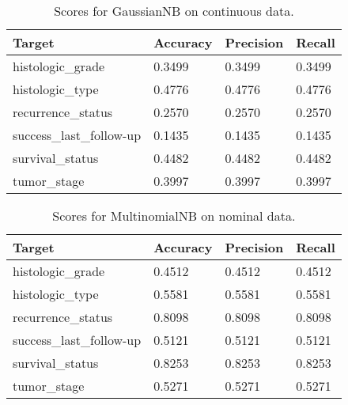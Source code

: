 \documentclass{article}
\begin{document}
\begin{table}[H]
  \begin{center}
  \begin{tabular}{ *{4}{l} }
      \multicolumn{1}{p{1.5cm}}{\raggedright Target} &  
      \multicolumn{1}{p{1.5cm}}{\raggedright Accuracy} &  
      \multicolumn{1}{p{1.5cm}}{\raggedright Precision} &  
      \multicolumn{1}{p{1.5cm}}{\raggedright Recall} \\ \hline
histologic\_grade         &       0.3499 &        0.3499 &     0.3499 \\
histologic\_type          &       0.4776 &        0.4776 &     0.4776 \\
recurrence\_status        &       0.2570 &        0.2570 &     0.2570 \\
success\_last\_follow-up  &       0.1435 &        0.1435 &     0.1435 \\
survival\_status          &       0.4482 &        0.4482 &     0.4482 \\
tumor\_stage              &       0.3997 &        0.3997 &     0.3997 \\
\end{tabular}
\caption{Scores for GaussianNB on continuous data.}
\end{center}
\end{table}

\begin{table}[H]
  \begin{center}
  \begin{tabular}{ *{4}{l} }
      \multicolumn{1}{p{1.5cm}}{\raggedright Target} &  
      \multicolumn{1}{p{1.5cm}}{\raggedright Accuracy} &  
      \multicolumn{1}{p{1.5cm}}{\raggedright Precision} &  
      \multicolumn{1}{p{1.5cm}}{\raggedright Recall} \\ \hline
histologic\_grade        &       0.4512 &        0.4512 &     0.4512 \\
histologic\_type         &       0.5581 &        0.5581 &     0.5581 \\
recurrence\_status       &       0.8098 &        0.8098 &     0.8098 \\
success\_last\_follow-up &       0.5121 &        0.5121 &     0.5121 \\
survival\_status         &       0.8253 &        0.8253 &     0.8253 \\
tumor\_stage             &       0.5271 &        0.5271 &     0.5271 \\
\end{tabular}
\caption{Scores for MultinomialNB on nominal data.}
\end{center}
\end{table}
\end{document}
